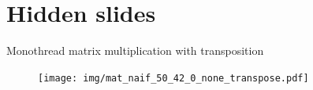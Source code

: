 \documentclass[xcolor={usenames,dvipsnames}]{beamer}
\newcommand{\sectiontitle}{}
\newcommand{\newHsection}[1]{\renewcommand{\sectiontitle}{#1}\section*{#1}}
\begin{document}
\newHsection{Hidden slides}
\setcounter{framenumber}{\value{finalframe}}

\begin{frame}{Monothread  matrix multiplication with transposition}
    \begin{figure}
        \centering
        \texttt{[image: img/mat\_naif\_50\_42\_0\_none\_transpose.pdf]}
    \end{figure}
\end{frame}


\end{document}
